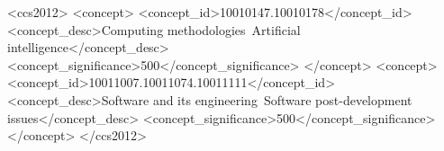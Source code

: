 \documentclass[sigconf]{acmart}
\begin{document}
\begin{abstract}
  
\end{abstract}



\begin{CCSXML}
<ccs2012>
   <concept>
       <concept_id>10010147.10010178</concept_id>
       <concept_desc>Computing methodologies~Artificial intelligence</concept_desc>
       <concept_significance>500</concept_significance>
       </concept>
   <concept>
       <concept_id>10011007.10011074.10011111</concept_id>
       <concept_desc>Software and its engineering~Software post-development issues</concept_desc>
       <concept_significance>500</concept_significance>
       </concept>
 </ccs2012>
\end{CCSXML}

\end{document}
